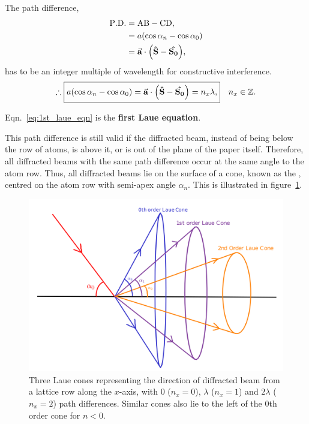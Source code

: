 	The path difference,%
%		
		\begin{align}
		\mathrm{P.D.} &= \mathrm{AB - CD}, \nonumber\\
					  &= a \qty( \cos \alpha_n - \cos \alpha_0 ) \\
					  &= \va{a} \cdot \qty( \vu{S} - \vu{S_0} ),
		\end{align}%
%		
	has to be an integer multiple of wavelength for constructive interference.%
%		
		\begin{equation}
		\therefore \boxed{a \qty( \cos \alpha_n - \cos \alpha_0 ) = \va{a} \cdot \qty( \vu{S} - \vu{S_0} ) = n_x \lambda,} \quad n_x \in \mathbb{Z}. \label{eq:1st_laue_eqn}
		\end{equation}
		
	Eqn.~\eqref{eq:1st_laue_eqn} is the \textbf{first Laue equation}.
	
	This path difference is still valid if the diffracted beam, instead of being below the row of atoms, is above it, or is out of the plane of the paper itself. Therefore, all diffracted beams with the same path difference occur at the same angle to the atom row. Thus, all diffracted beams lie on the surface of a cone, known as the , centred on the atom row with semi-apex angle $\alpha_n.$ This is illustrated in figure~\ref{fig:laue_cones}.
	
	\begin{figure}
	\centering
	\includegraphics[scale=0.17]{laue_cones.png}
	\caption{\label{fig:laue_cones}Three Laue cones representing the direction of diffracted beam from a lattice row along the $x$-axis, with $0$ ($n_x = 0$), $\lambda$ ($n_x = 1$) and $2\lambda$ ($n_x = 2$) path differences. Similar cones also lie to the left of the 0th order cone for $n < 0.$}
	\end{figure}
	

